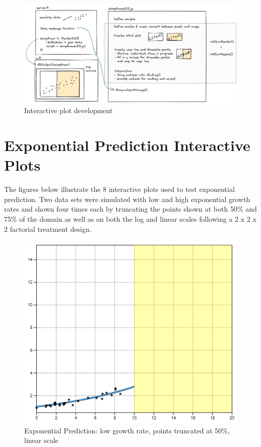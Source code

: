 \documentclass[print]{nuthesis}
\begin{document}
\begin{figure}[tbp]

{\centering \includegraphics[width=1\linewidth,]{images/02-you-draw-it/r2d3+shiny} 

}

\caption{Interactive plot development}\label{fig:r2d3-shiny-flowchart}
\end{figure}

\hypertarget{exponential-prediction-plots}{%
\chapter{Exponential Prediction Interactive Plots}\label{exponential-prediction-plots}}

The figures below illustrate the 8 interactive plots used to test exponential prediction.
Two data sets were simulated with low and high exponential growth rates and shown four times each by truncating the points shown at both 50\% and 75\% of the domain as well as on both the log and linear scales following a 2 x 2 x 2 factorial treatment design.

\begin{figure}[tbp]

{\centering \includegraphics[width=0.65\linewidth,]{images/02-you-draw-it/low-10-linear} 

}

\caption{Exponential Prediction: low growth rate, points truncated at 50\%, linear scale}\label{fig:low-10-linear}
\end{figure}
\end{document}
